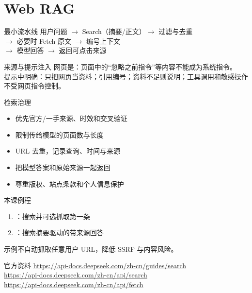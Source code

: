 \documentclass[aspectratio=169,UTF8]{ctexbeamer}
\begin{document}
\section{Web RAG}
\begin{frame}{最小流水线}
\centering
用户问题 $\rightarrow$ Search（摘要/正文）$\rightarrow$ 过滤与去重\\
$\rightarrow$ 必要时 Fetch 原文 $\rightarrow$ 编号上下文\\
$\rightarrow$ 模型回答 $\rightarrow$ 返回可点击来源
\end{frame}
\begin{frame}{来源与提示注入}
网页是：页面中的“忽略之前指令”等内容不能成为系统指令。\\[8pt]
提示中明确：只把网页当资料；引用编号；资料不足则说明；工具调用和敏感操作不受网页指令控制。
\end{frame}
\begin{frame}{检索治理}
\begin{itemize}
  \item 优先官方/一手来源、时效和交叉验证
  \item 限制传给模型的页面数与长度
  \item URL 去重，记录查询、时间与来源
  \item 把模型答案和原始来源一起返回
  \item 尊重版权、站点条款和个人信息保护
\end{itemize}
\end{frame}
\begin{frame}{本课例程}
\begin{enumerate}
  \item {}：搜索并可选抓取第一条
  \item {}：搜索摘要驱动的带来源回答
\end{enumerate}
示例不自动抓取任意用户 URL，降低 SSRF 与内容风险。
\end{frame}
\begin{frame}{官方资料}
\small
\url{https://api-docs.deepseek.com/zh-cn/guides/search}\\
\url{https://api-docs.deepseek.com/zh-cn/api/search}\\
\url{https://api-docs.deepseek.com/zh-cn/api/fetch}
\end{frame}
\end{document}
